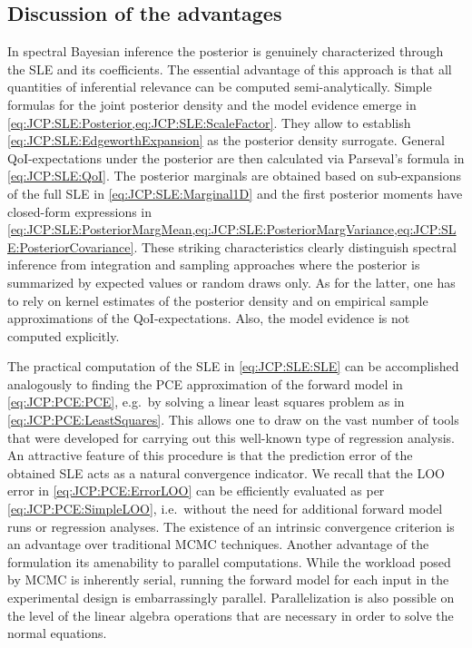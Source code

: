 \subsection{Discussion of the advantages}
In spectral Bayesian inference the posterior is genuinely characterized through the SLE and its coefficients.
The essential advantage of this approach is that all quantities of inferential relevance can be computed semi-analytically.
Simple formulas for the joint posterior density and the model evidence emerge in \cref{eq:JCP:SLE:Posterior,eq:JCP:SLE:ScaleFactor}.
They allow to establish \cref{eq:JCP:SLE:EdgeworthExpansion} as the posterior density surrogate.
General QoI-expectations under the posterior are then calculated via Parseval's formula in \cref{eq:JCP:SLE:QoI}.
The posterior marginals are obtained based on sub-expansions of the full SLE in \cref{eq:JCP:SLE:Marginal1D} and the first posterior moments
have closed-form expressions in \cref{eq:JCP:SLE:PosteriorMargMean,eq:JCP:SLE:PosteriorMargVariance,eq:JCP:SLE:PosteriorCovariance}.
These striking characteristics clearly distinguish spectral inference from integration and sampling approaches
where the posterior is summarized by expected values or random draws only.
As for the latter, one has to rely on kernel estimates of the posterior density and on empirical sample approximations of the QoI-expectations.
Also, the model evidence is not computed explicitly.
\par %
The practical computation of the SLE in \cref{eq:JCP:SLE:SLE} can be accomplished analogously to finding the PCE approximation of the forward model in \cref{eq:JCP:PCE:PCE},
e.g.\ by solving a linear least squares problem as in \cref{eq:JCP:PCE:LeastSquares}.
This allows one to draw on the vast number of tools that were developed for carrying out this well-known type of regression analysis.
An attractive feature of this procedure is that the prediction error of the obtained SLE acts as a natural convergence indicator.
We recall that the LOO error in \cref{eq:JCP:PCE:ErrorLOO} can be efficiently evaluated as per \cref{eq:JCP:PCE:SimpleLOO},
i.e.\ without the need for additional forward model runs or regression analyses.
The existence of an intrinsic convergence criterion is an advantage over traditional MCMC techniques.
Another advantage of the formulation its amenability to parallel computations.
While the workload posed by MCMC is inherently serial, running the forward model for each input in the experimental design is embarrassingly parallel.
Parallelization is also possible on the level of the linear algebra operations that are necessary in order to solve the normal equations.

